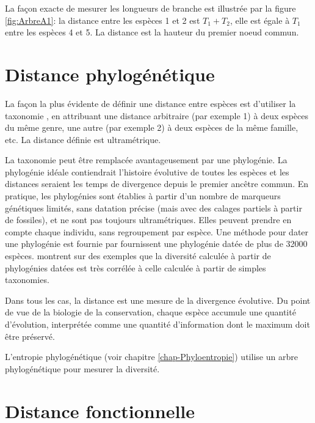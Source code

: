\documentclass[
  11pt,
  french,
  a4paper,
  extrafontsizes,onecolumn,openright
  ]{memoir}
\begin{document}
\normalsize

La façon exacte de mesurer les longueurs de branche est illustrée par la figure \ref{fig:ArbreA1}: la distance entre les espèces 1 et 2 est \(T_1+T_2\), elle est égale à \(T_1\) entre les espèces 4 et 5.
La distance est la hauteur du premier noeud commun.

\section{Distance phylogénétique}\label{sec-Dphylo}

La façon la plus évidente de définir une distance entre espèces est d'utiliser la taxonomie \autocite[Warwick2001]{Clarke2001}, en attribuant une distance arbitraire (par exemple 1) à deux espèces du même genre, une autre (par exemple 2) à deux espèces de la même famille, etc.
La distance définie est ultramétrique.

La taxonomie peut être remplacée avantageusement par une phylogénie.
La phylogénie idéale contiendrait l'histoire évolutive de toutes les espèces et les distances seraient les temps de divergence depuis le premier ancêtre commun.
En pratique, les phylogénies sont établies à partir d'un nombre de marqueurs génétiques limités, sans datation précise (mais avec des calages partiels à partir de fossiles), et ne sont pas toujours ultramétriques.
Elles peuvent prendre en compte chaque individu, sans regroupement par espèce.
Une méthode pour dater une phylogénie est fournie par \textcite{Chave2007}
\textcite{Zanne2014} fournissent une phylogénie datée de plus de 32000 espèces.
\textcite{Ricotta2012a} montrent sur des exemples que la diversité calculée à partir de phylogénies datées est très corrélée à celle calculée à partir de simples taxonomies.

Dans tous les cas, la distance est une mesure de la divergence évolutive.
Du point de vue de la biologie de la conservation, chaque espèce accumule une quantité d'évolution, interprétée comme une quantité d'information \autocite{Crozier1997} dont le maximum doit être préservé.

L'entropie phylogénétique (voir chapitre \ref{chap-Phyloentropie}) utilise un arbre phylogénétique pour mesurer la diversité.

\section{Distance fonctionnelle}\label{sec-DFonctionnelle}
\end{document}
